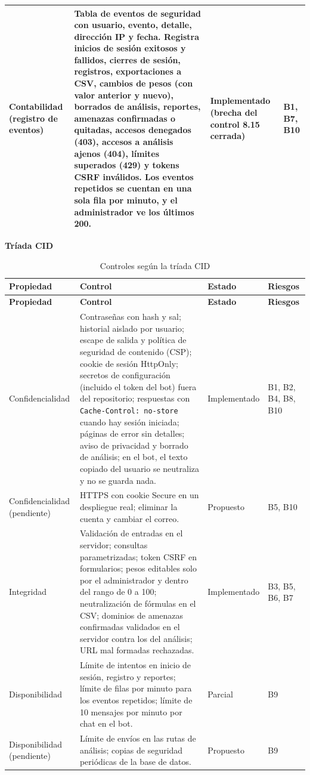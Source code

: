 \documentclass[journal,onecolumn,12pt,draftclsnofoot]{IEEEtran}
\newcommand{\apartado}[1]{\par\medskip\noindent\textbf{#1}\par\smallskip}
\begin{document}
\begin{longtable}{|>{\raggedright\arraybackslash}p{}|>{\raggedright\arraybackslash}p{}|>{\raggedright\arraybackslash}p{}|>{\raggedright\arraybackslash}p{}|}
Contabilidad (registro de eventos) & Tabla de eventos de seguridad con usuario, evento, detalle, dirección IP y fecha. Registra inicios de sesión exitosos y fallidos, cierres de sesión, registros, exportaciones a CSV, cambios de pesos (con valor anterior y nuevo), borrados de análisis, reportes, amenazas confirmadas o quitadas, accesos denegados (403), accesos a análisis ajenos (404), límites superados (429) y tokens CSRF inválidos. Los eventos repetidos se cuentan en una sola fila por minuto, y el administrador ve los últimos 200. & Implementado (brecha del control 8.15 cerrada) & B1, B7, B10 \\ \hline
\end{longtable}
\endgroup

\apartado{Tríada CID}

\begingroup
\footnotesize
\setlength{\tabcolsep}{3pt}
\begin{longtable}{|>{\raggedright\arraybackslash}p{}|>{\raggedright\arraybackslash}p{}|>{\raggedright\arraybackslash}p{}|>{\raggedright\arraybackslash}p{}|}
\caption{Controles según la tríada CID}\label{tab:cid}\\
\hline
\textbf{Propiedad} & \textbf{Control} & \textbf{Estado} & \textbf{Riesgos} \\ \hline
\endfirsthead
\hline
\textbf{Propiedad} & \textbf{Control} & \textbf{Estado} & \textbf{Riesgos} \\ \hline
\endhead
Confidencialidad & Contraseñas con hash y sal; historial aislado por usuario; escape de salida y política de seguridad de contenido (CSP); cookie de sesión HttpOnly; secretos de configuración (incluido el token del bot) fuera del repositorio; respuestas con \texttt{Cache-Control: no-store} cuando hay sesión iniciada; páginas de error sin detalles; aviso de privacidad y borrado de análisis; en el bot, el texto copiado del usuario se neutraliza y no se guarda nada. & Implementado & B1, B2, B4, B8, B10 \\ \hline
Confidencialidad (pendiente) & HTTPS con cookie Secure en un despliegue real; eliminar la cuenta y cambiar el correo. & Propuesto & B5, B10 \\ \hline
Integridad & Validación de entradas en el servidor; consultas parametrizadas; token CSRF en formularios; pesos editables solo por el administrador y dentro del rango de 0 a 100; neutralización de fórmulas en el CSV; dominios de amenazas confirmadas validados en el servidor contra los del análisis; URL mal formadas rechazadas. & Implementado & B3, B5, B6, B7 \\ \hline
Disponibilidad & Límite de intentos en inicio de sesión, registro y reportes; límite de filas por minuto para los eventos repetidos; límite de 10 mensajes por minuto por chat en el bot. & Parcial & B9 \\ \hline
Disponibilidad (pendiente) & Límite de envíos en las rutas de análisis; copias de seguridad periódicas de la base de datos. & Propuesto & B9 \\ \hline
\end{longtable}
\end{document}
